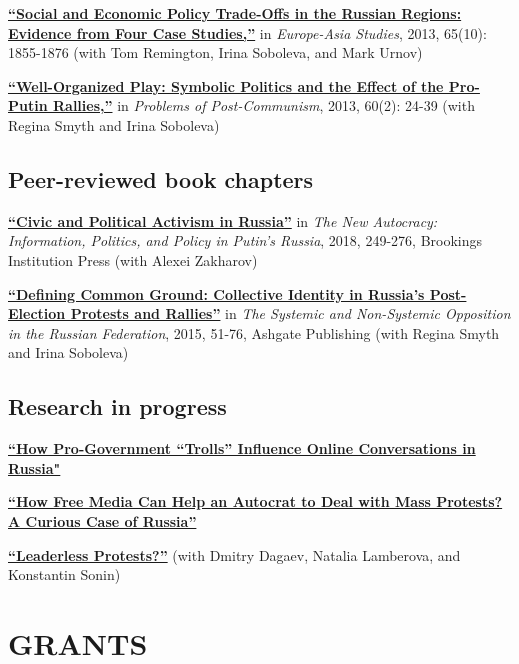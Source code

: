 \documentclass[11pt,]{article}
\begin{document}
\href{http://www.tandfonline.com/doi/full/10.1080/09668136.2013.838055}{\textbf{``Social
and Economic Policy Trade-Offs in the Russian Regions: Evidence from
Four Case Studies,''}} in \emph{Europe-Asia Studies}, 2013, 65(10):
1855-1876 (with Tom Remington, Irina Soboleva, and Mark Urnov)

\href{“Well-Organized\%20Play:\%20Symbolic\%20Politics\%20and\%20the\%20Effect\%20of\%20the\%20Pro-Putin\%20Rallies,”}{\textbf{``Well-Organized
Play: Symbolic Politics and the Effect of the Pro-Putin Rallies,''}} in
\emph{Problems of Post-Communism}, 2013, 60(2): 24-39 (with Regina Smyth
and Irina Soboleva)

\hypertarget{peer-reviewed-book-chapters}{%
\subsection{Peer-reviewed book
chapters}\label{peer-reviewed-book-chapters}}

\href{http://www.jstor.org/stable/10.7864/j.ctt1zkjzsh.13}{\textbf{``Civic
and Political Activism in Russia''}} in \emph{The New Autocracy:
Information, Politics, and Policy in Putin's Russia}, 2018, 249-276,
Brookings Institution Press (with Alexei Zakharov)

\href{https://AntonSobolev.github.com/files/2013-Defining-Commong-Ground.pdf}{\textbf{``Defining
Common Ground: Collective Identity in Russia's Post-Election Protests
and Rallies''}} in \emph{The Systemic and Non-Systemic Opposition in the
Russian Federation}, 2015, 51-76, Ashgate Publishing (with Regina Smyth
and Irina Soboleva)

\hypertarget{research-in-progress}{%
\subsection{Research in progress}\label{research-in-progress}}

\protect\hyperlink{working}{\textbf{``How Pro-Government ``Trolls''
Influence Online Conversations in Russia"}}

\protect\hyperlink{working}{\textbf{``How Free Media Can Help an
Autocrat to Deal with Mass Protests? A Curious Case of Russia''}}

\protect\hyperlink{working}{\textbf{``Leaderless Protests?''}} (with
Dmitry Dagaev, Natalia Lamberova, and Konstantin Sonin)

\hypertarget{grants}{%
\section{GRANTS}\label{grants}}
\end{document}
